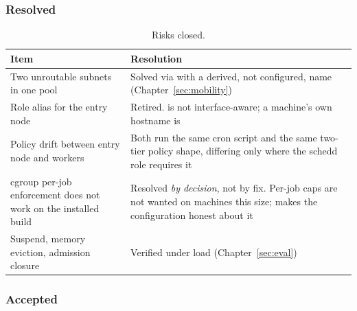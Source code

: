 \subsubsection{Resolved}

\begin{table}[H]
\centering
\begin{tabularx}{\textwidth}{L{0.36\textwidth} Y}
\toprule
\textbf{Item} & \textbf{Resolution} \\
\midrule
Two unroutable subnets in one pool & Solved via  with a derived, not configured, name (Chapter~\ref{sec:mobility}) \\
Role alias for the entry node & Retired.  is not interface-aware; a machine's own hostname is \\
Policy drift between entry node and workers & Both run the same cron script and the same two-tier policy shape, differing only where the schedd role requires it \\
cgroup per-job enforcement does not work on the installed build & Resolved \emph{by decision}, not by fix. Per-job caps are not wanted on machines this size;  makes the configuration honest about it \\
Suspend, memory eviction, admission closure & Verified under load (Chapter~\ref{sec:eval}) \\
\bottomrule
\end{tabularx}
\caption{Risks closed.}
\end{table}

\subsubsection{Accepted}

